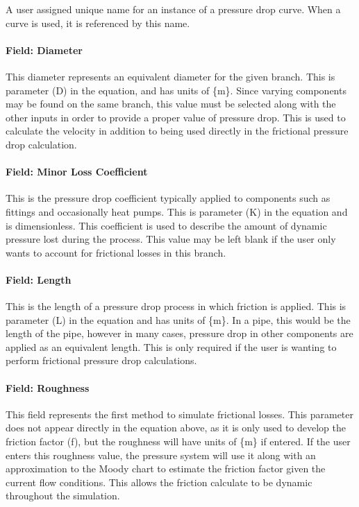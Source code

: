 A user assigned unique name for an instance of a pressure drop curve. When a curve is used, it is referenced by this name.

\paragraph{Field: Diameter}\label{field-diameter-000}

This diameter represents an equivalent diameter for the given branch. This is parameter (D) in the equation, and has units of \{m\}. Since varying components may be found on the same branch, this value must be selected along with the other inputs in order to provide a proper value of pressure drop. This is used to calculate the velocity in addition to being used directly in the frictional pressure drop calculation.

\paragraph{Field: Minor Loss Coefficient}\label{field-minor-loss-coefficient}

This is the pressure drop coefficient typically applied to components such as fittings and occasionally heat pumps. This is parameter (K) in the equation and is dimensionless. This coefficient is used to describe the amount of dynamic pressure lost during the process. This value may be left blank if the user only wants to account for frictional losses in this branch.

\paragraph{Field: Length}\label{field-length}

This is the length of a pressure drop process in which friction is applied. This is parameter (L) in the equation and has units of \{m\}. In a pipe, this would be the length of the pipe, however in many cases, pressure drop in other components are applied as an equivalent length. This is only required if the user is wanting to perform frictional pressure drop calculations.

\paragraph{Field: Roughness}\label{field-roughness}

This field represents the first method to simulate frictional losses. This parameter does not appear directly in the equation above, as it is only used to develop the friction factor (f), but the roughness will have units of \{m\} if entered. If the user enters this roughness value, the pressure system will use it along with an approximation to the Moody chart to estimate the friction factor given the current flow conditions. This allows the friction calculate to be dynamic throughout the simulation.

